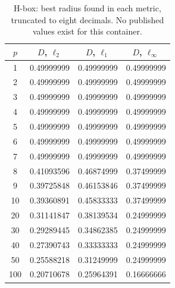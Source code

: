 \begin{table}[t]
  \centering
  \caption{H-box: best radius found in each metric, truncated to eight decimals. No published values exist for this container.}
  \label{tab:h_box}
  \begin{tabular}{cccc}
    \hline
    $p$ & $D$, $\ell_2$ & $D$, $\ell_1$ & $D$, $\ell_\infty$ \\
    \hline
    1 & 0.49999999 & 0.49999999 & 0.49999999 \\
    2 & 0.49999999 & 0.49999999 & 0.49999999 \\
    3 & 0.49999999 & 0.49999999 & 0.49999999 \\
    4 & 0.49999999 & 0.49999999 & 0.49999999 \\
    5 & 0.49999999 & 0.49999999 & 0.49999999 \\
    6 & 0.49999999 & 0.49999999 & 0.49999999 \\
    7 & 0.49999999 & 0.49999999 & 0.49999999 \\
    8 & 0.41093596 & 0.46874999 & 0.37499999 \\
    9 & 0.39725848 & 0.46153846 & 0.37499999 \\
    10 & 0.39360891 & 0.45833333 & 0.37499999 \\
    20 & 0.31141847 & 0.38139534 & 0.24999999 \\
    30 & 0.29289445 & 0.34862385 & 0.24999999 \\
    40 & 0.27390743 & 0.33333333 & 0.24999999 \\
    50 & 0.25588218 & 0.31249999 & 0.24999999 \\
    100 & 0.20710678 & 0.25964391 & 0.16666666 \\
    \hline
  \end{tabular}
\end{table}
